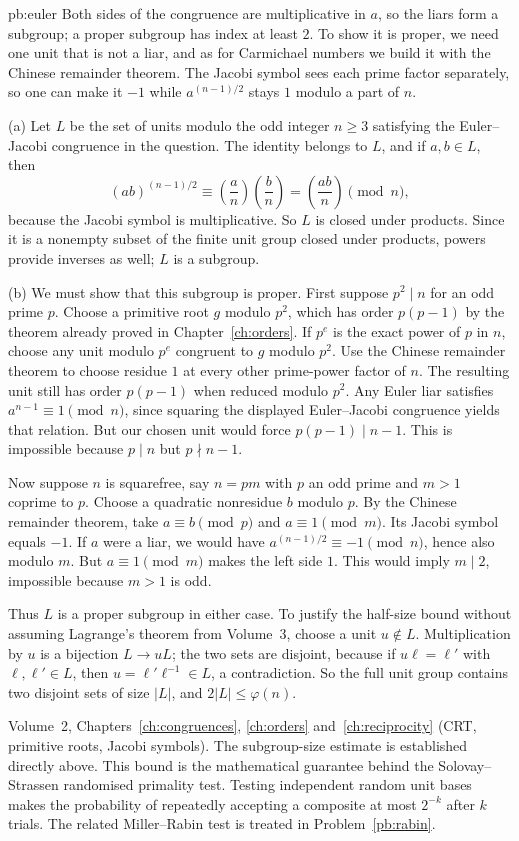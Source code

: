 \begin{solution}{pb:euler}
\idea Both sides of the congruence are multiplicative in $a$, so the liars form a subgroup; a proper subgroup has index at
least $2$. To show it is proper, we need one unit that is not a liar, and as for Carmichael numbers we build it with the
Chinese remainder theorem. The Jacobi symbol sees each prime factor separately, so one can make it $-1$ while $a^{(n-1)/2}$
stays $1$ modulo a part of $n$.

\writeup (a) Let $L$ be the set of units modulo the odd integer $n\ge3$ satisfying the Euler--Jacobi congruence in the question. The identity belongs to $L$, and if $a,b\in L$, then
\[
(ab)^{(n-1)/2}\equiv
\left(\frac an\right)\left(\frac bn\right)
=\left(\frac{ab}n\right)\pmod n,
\]
because the Jacobi symbol is multiplicative. So $L$ is closed under products. Since it is a nonempty subset of the finite unit group closed under products, powers provide inverses as well; $L$ is a subgroup.

(b) We must show that this subgroup is proper. First suppose $p^2\mid n$ for an odd prime $p$. Choose a primitive root $g$ modulo $p^2$, which has order $p(p-1)$ by the theorem already proved in Chapter~\ref{ch:orders}. If $p^e$ is the exact power of $p$ in $n$, choose any unit modulo $p^e$ congruent to $g$ modulo $p^2$. Use the Chinese remainder theorem to choose residue $1$ at every other prime-power factor of $n$. The resulting unit still has order $p(p-1)$ when reduced modulo $p^2$. Any Euler liar satisfies $a^{n-1}\equiv1\pmod n$, since squaring the displayed Euler--Jacobi congruence yields that relation. But our chosen unit would force $p(p-1)\mid n-1$. This is impossible because $p\mid n$ but $p\nmid n-1$.

Now suppose $n$ is squarefree, say $n=pm$ with $p$ an odd prime and $m>1$ coprime to $p$. Choose a quadratic nonresidue $b$ modulo $p$. By the Chinese remainder theorem, take $a\equiv b\pmod p$ and $a\equiv1\pmod m$. Its Jacobi symbol equals $-1$. If $a$ were a liar, we would have $a^{(n-1)/2}\equiv-1\pmod n$, hence also modulo $m$. But $a\equiv1\pmod m$ makes the left side $1$. This would imply $m\mid2$, impossible because $m>1$ is odd.

Thus $L$ is a proper subgroup in either case. To justify the
half-size bound without assuming Lagrange's theorem from Volume~3,
choose a unit $u\notin L$. Multiplication by $u$ is a bijection
$L\to uL$; the two sets are disjoint, because if $u\ell=\ell'$
with $\ell,\ell'\in L$, then $u=\ell'\ell^{-1}\in L$, a
contradiction. So the full unit group contains two disjoint sets
of size $|L|$, and $2|L|\le\varphi(n)$.

\tools Volume~2, Chapters~\ref{ch:congruences}, \ref{ch:orders}
and~\ref{ch:reciprocity} (CRT, primitive roots, Jacobi symbols).
The subgroup-size estimate is established directly above.
\leads This bound is the mathematical guarantee behind the Solovay--Strassen randomised primality test. Testing independent random unit bases makes the probability of repeatedly accepting a composite at most $2^{-k}$ after $k$ trials. The related Miller--Rabin test is treated in Problem~\ref{pb:rabin}.
\end{solution}

